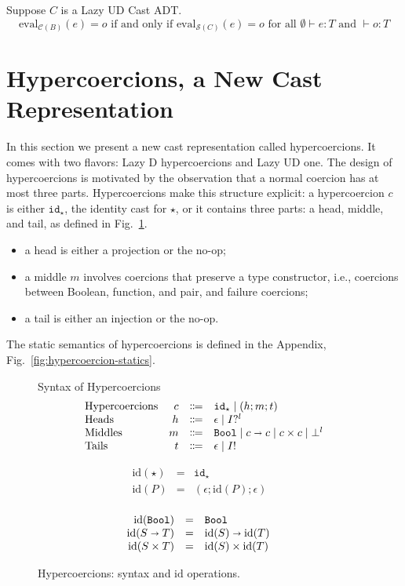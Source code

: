 \documentclass[runningheads]{llncs}
\newcommand{\figequalto}[3]{#1 & = & #2 & #3 \\}
\newcommand{\stxrule}[3]{\text{#2} & #1 & \Coloneqq & #3\\}
\newcommand{\figref}[1]{Fig.~\ref{#1}}
\newcommand{\CMachine}[1]{\ensuremath{\mathcal{C}(#1)}}
\newcommand{\CBMachine}[0]{\CMachine{B}}
\newcommand{\SMachine}[1]{\ensuremath{\mathcal{S}(#1)}}
\newcommand{\Tdyn}[0]{\ensuremath{\star}}
\newcommand{\Pbool}[0]{\ensuremath{\mathtt{Bool}}}
\newcommand{\Pfunc}[2]{\ensuremath{#1 \shortrightarrow #2}}
\newcommand{\Pprod}[2]{\ensuremath{#1 \times #2}}
\newcommand{\cnfid}[1]{\ensuremath{\mathtt{id}_{#1}}}
\newcommand{\hcci}[0]{\cnfid{\Tdyn}}
\newcommand{\hccc}[3]{\ensuremath{(#1;#2;#3)}}
\newcommand{\hche}[0]{\ensuremath{\epsilon}}
\newcommand{\hchp}[2]{\ensuremath{#1?^{#2}}}
\newcommand{\hcmbool}[0]{\Pbool}
\newcommand{\hcmfunc}[2]{\Pfunc{#1}{#2}}
\newcommand{\hcmprod}[2]{\Pprod{#1}{#2}}
\newcommand{\hcmfail}[1]{\ensuremath{\bot^l}}
\newcommand{\hcte}[0]{\ensuremath{\epsilon}}
\newcommand{\hcti}[1]{\ensuremath{#1!}}
\newcommand{\id}[1]{\ensuremath{\mathrm{id}(#1)}}
\newcommand{\expressiontyping}[3]{\ensuremath{#1 \vdash #2 : #3}}
\newcommand{\valuetyping}[2]{\ensuremath{\vdash #1 : #2}}
\newcommand{\withmachineevalto}[3]{\ensuremath{\mathrm{eval}_{#1}(#2)=#3}}
\newcommand{\machineequiv}[2]{
	\ensuremath{
		\withmachineevalto{#1}{e}{o}	
		\text{ if and only if }
		\withmachineevalto{#2}{e}{o}
		\text{ for all }
		\expressiontyping{\emptyset}{e}{T}
		\text{ and }
		\valuetyping{o}{T}
	}}
\begin{document}
\begin{theorem}[Correctness of Lazy UD \SMachine{C}]
	\label{thm:SUD-equiv}
	Suppose $C$ is a Lazy UD Cast ADT.
	\[
	\machineequiv{\CBMachine}{\SMachine{C}}
	\]
\end{theorem}

\section{Hypercoercions, a New Cast Representation} \label{sec:hypercoercions}

In this section we present a new cast representation called hypercoercions. It 
comes with two flavors: Lazy D hypercoercions and Lazy UD one.  The design of 
hypercoercions is motivated by the observation that a normal coercion has at most three
parts. Hypercoercions make this structure explicit: a hypercoercion $c$ is
either \hcci, the identity cast for \Tdyn, or it contains
three parts: a head, middle, and tail, as defined in
\figref{fig:hypercoercion}. 
\begin{itemize}
\item a head is either a projection or the no-op;
\item a middle $m$ involves coercions that preserve a type
  constructor, i.e., coercions between Boolean, function, and pair, and 
  failure coercions;
\item a tail is either an injection or the no-op.
\end{itemize}
The static semantics of hypercoercions is defined in the Appendix,
\figref{fig:hypercoercion-statics}.

\begin{figure}[tp]
	Syntax of Hypercoercions
	\[
	\begin{array}{lrcl}
	\stxrule{c}{Hypercoercions}{
		\hcci           \mid
		\hccc{h}{m}{t}
	}
	\stxrule{h}{Heads}{
		\hche     \mid
		\hchp{I}{l}
	}
	\stxrule{m}{Middles}{
		\hcmbool       \mid
		\hcmfunc{c}{c} \mid
		\hcmprod{c}{c} \mid
		\hcmfail{l}    
	}
	\stxrule{t}{Tails}{
		\hcte     \mid
		\hcti{I}
	}
	\end{array}
	\]
	
	\[
	\begin{array}{rclr}
	\figequalto{\id{\star}}{
		\hcci
	}{}
	\figequalto{\id{P}}{
		\hccc{\hche}{\id{P}}{\hcte}
	}{}
	\end{array}
	\]
	
	\[
	\begin{array}{rclr}
	\figequalto{\id{\Pbool}}{\hcmbool}{}
	\figequalto{\id{\Pfunc{S}{T}}}{
		\hcmfunc{\id{S}}{\id{T}}
	}{}
	\figequalto{\id{\Pprod{S}{T}}}{
		\hcmprod{\id{S}}{\id{T}}
	}{}
	\end{array}
	\]
	
	\caption{Hypercoercions: syntax and $\mathrm{id}$ operations.}
	\label{fig:hypercoercion}
\end{figure}
\end{document}
